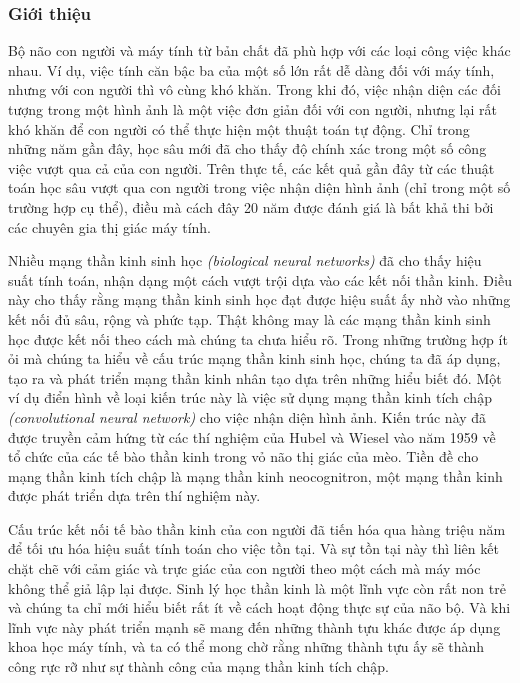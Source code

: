 \subsubsection{Giới thiệu}
Bộ não con người và máy tính từ bản chất đã phù hợp với các loại công việc khác nhau. Ví dụ, việc tính căn bậc ba của một số lớn rất dễ dàng đối với máy tính, nhưng với con người thì vô cùng khó khăn. Trong khi đó, việc nhận diện các đối tượng trong một hình ảnh là một việc đơn giản đối với con người, nhưng lại rất khó khăn để con người có thể thực hiện một thuật toán tự động. Chỉ trong những năm gần đây, học sâu mới đã cho thấy độ chính xác trong một số công việc vượt qua cả của con người. Trên thực tế, các kết quả gần đây từ các thuật toán học sâu vượt qua con người trong việc nhận diện hình ảnh (chỉ trong một số trường hợp cụ thể), điều mà cách đây 20 năm được đánh giá là bất khả thi bởi các chuyên gia thị giác máy tính.\cite{Aggarwal2023}

Nhiều mạng thần kinh sinh học \textit{(biological neural networks)} đã cho thấy hiệu suất tính toán, nhận dạng một cách vượt trội dựa vào các kết nối thần kinh. Điều này cho thấy rằng mạng thần kinh sinh học đạt được hiệu suất ấy nhờ vào những kết nối đủ sâu, rộng và phức tạp. Thật không may là các mạng thần kinh sinh học được kết nối theo cách mà chúng ta chưa hiểu rõ. Trong những trường hợp ít ỏi mà chúng ta hiểu về cấu trúc mạng thần kinh sinh học, chúng ta đã áp dụng, tạo ra và phát triển mạng thần kinh nhân tạo dựa trên những hiểu biết đó. Một ví dụ điển hình về loại kiến trúc này là việc sử dụng mạng thần kinh tích chập \textit{(convolutional neural network)} cho việc nhận diện hình ảnh. Kiến trúc này đã được truyền cảm hứng từ các thí nghiệm của Hubel và Wiesel vào năm 1959 về tổ chức của các tế bào thần kinh trong vỏ não thị giác của mèo. Tiền đề cho mạng thần kinh tích chập là mạng thần kinh neocognitron, một mạng thần kinh được phát triển dựa trên thí nghiệm này.\cite{Aggarwal2023}

Cấu trúc kết nối tế bào thần kinh của con người đã tiến hóa qua hàng triệu năm để tối ưu hóa hiệu suất tính toán cho việc tồn tại. Và sự tồn tại này thì liên kết chặt chẽ với cảm giác và trực giác của con người theo một cách mà máy móc không thể giả lập lại được. Sinh lý học thần kinh là một lĩnh vực còn rất non trẻ và chúng ta chỉ mới hiểu biết rất ít về cách hoạt động thực sự của não bộ. Và khi lĩnh vực này phát triển mạnh sẽ mang đến những thành tựu khác được áp dụng khoa học máy tính, và ta có thể mong chờ rằng những thành tựu ấy sẽ thành công rực rỡ như sự thành công của mạng thần kinh tích chập.\cite{Aggarwal2023}

